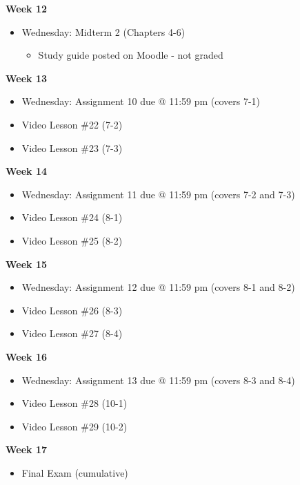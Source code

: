\documentclass[12pt]{letter}
\newcommand{\?}{\stackrel{?}{=}}
\begin{document}
	\textbf{Week 12} \begin{itemize} \vspace{-12pt}
		\item Wednesday: Midterm 2 (Chapters 4-6) \begin{itemize}
			\item Study guide posted on Moodle - not graded
		\end{itemize}
	\end{itemize}

	\textbf{Week 13} \begin{itemize} \vspace{-12pt}
		\item Wednesday: Assignment 10 due @ 11:59 pm (covers 7-1)
		\item Video Lesson \#22 (7-2)
		\item Video Lesson \#23 (7-3)
	\end{itemize}

	\textbf{Week 14} \begin{itemize} \vspace{-12pt}
		\item Wednesday: Assignment 11 due @ 11:59 pm (covers 7-2 and 7-3)
		\item Video Lesson \#24 (8-1)
		\item Video Lesson \#25 (8-2)
	\end{itemize}
	
	\textbf{Week 15} \begin{itemize} \vspace{-12pt}
		\item Wednesday: Assignment 12 due @ 11:59 pm (covers 8-1 and 8-2)
		\item Video Lesson \#26 (8-3)
		\item Video Lesson \#27 (8-4)
	\end{itemize}

	\textbf{Week 16} \begin{itemize} \vspace{-12pt}
		\item Wednesday: Assignment 13 due @ 11:59 pm (covers 8-3 and 8-4)
		\item Video Lesson \#28 (10-1)
		\item Video Lesson \#29 (10-2)
	\end{itemize}

	\textbf{Week 17} \begin{itemize} \vspace{-12pt}
		\item Final Exam (cumulative)
	\end{itemize}
	
\end{document}
